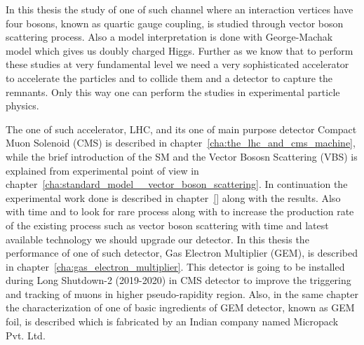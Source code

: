 In this thesis the study of one of such channel where an interaction vertices have four bosons, known as quartic gauge coupling, is studied through vector boson scattering process.
Also a model interpretation is done with George-Machak model which gives us doubly charged Higgs.
Further as we know that to perform these studies at very fundamental level we need a very sophisticated accelerator to accelerate the particles and to collide them and a detector to capture the remnants.
Only this way one can perform the studies in experimental particle physics.

The one of such accelerator, LHC, and its one of main purpose detector Compact Muon Solenoid (CMS) is described in chapter~\ref{cha:the_lhc_and_cms_machine}, while the brief introduction of the SM and the Vector Bososn Scattering (VBS) is explained from experimental point of view in chapter~\ref{cha:standard_model__vector_boson_scattering}. In continuation the experimental work done is described in chapter~\ref{} along with the results. Also with time and to look for rare process along with to increase the production rate of the existing process such as vector boson scattering with time and latest available technology we should upgrade our detector. In this thesis the performance of one of such detector, Gas Electron Multiplier (GEM), is described in chapter~\ref{cha:gas_electron_multiplier}. This detector is going to be installed during Long Shutdown-2 (2019-2020) in CMS detector to improve the triggering and tracking of muons in higher pseudo-rapidity region. Also, in the same chapter the characterization of one of basic ingredients of GEM detector, known as GEM foil, is described which is fabricated by an Indian company named Micropack Pvt. Ltd.
